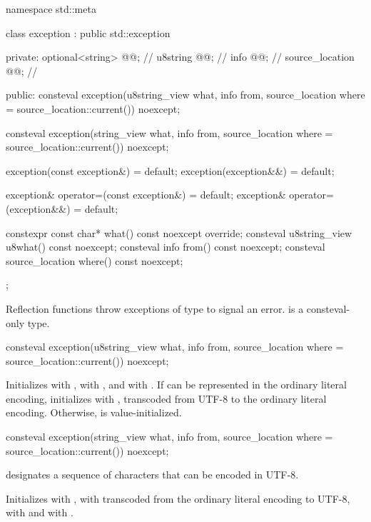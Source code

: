 %
\begin{codeblock}
namespace std::meta {
  class exception : public std::exception {
  private:
    optional<string> @@;     // \expos
    u8string @@;           // \expos
    info @@;                 // \expos
    source_location @@;     // \expos

  public:
    consteval exception(u8string_view what, info from,
                        source_location where = source_location::current()) noexcept;

    consteval exception(string_view what, info from,
                        source_location where = source_location::current()) noexcept;

    exception(const exception&) = default;
    exception(exception&&) = default;

    exception& operator=(const exception&) = default;
    exception& operator=(exception&&) = default;

    constexpr const char* what() const noexcept override;
    consteval u8string_view u8what() const noexcept;
    consteval info from() const noexcept;
    consteval source_location where() const noexcept;
  };
}
\end{codeblock}

\pnum
Reflection functions throw exceptions of type 
to signal an error.
 is a consteval-only type.

%
\begin{itemdecl}
consteval exception(u8string_view what, info from,
                    source_location where = source_location::current()) noexcept;
\end{itemdecl}
\begin{itemdescr}
\pnum
\effects
Initializes
 with ,
 with , and
 with .
If  can be represented in the ordinary literal encoding,
initializes  with ,
transcoded from UTF-8 to the ordinary literal encoding.
Otherwise,  is value-initialized.
\end{itemdescr}

%
\begin{itemdecl}
consteval exception(string_view what, info from,
                    source_location where = source_location::current()) noexcept;
\end{itemdecl}
\begin{itemdescr}
\pnum
\constantwhen
{} designates a sequence of characters
that can be encoded in UTF-8.

\pnum
\effects
Initializes
 with ,
 with 
transcoded from the ordinary literal encoding to UTF-8,
 with  and
 with .
\end{itemdescr}

